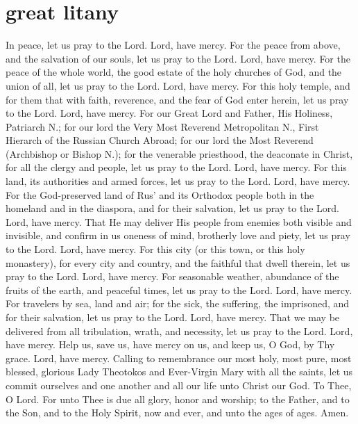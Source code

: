 \section{great litany}
\begin{liturgicaltext}
    \deacon In peace, let us pray to the Lord.
    \choir Lord, have mercy.
    \deacon For the peace from above, and the salvation of our souls, let us pray to the Lord.
    \choir Lord, have mercy.
    \deacon For the peace of the whole world, the good estate of the holy churches of God, and the union of all, let us pray to the Lord.
    \choir Lord, have mercy.
    \deacon For this holy temple, and for them that with faith, reverence, and the fear of God enter herein, let us pray to the Lord.
    \choir Lord, have mercy.
    \deacon For our Great Lord and Father, His Holiness, Patriarch N.; for our lord the Very Most Reverend Metropolitan N., First Hierarch of the Russian Church Abroad; for our lord the Most Reverend (Archbishop or Bishop N.); for the venerable priesthood, the deaconate in Christ, for all the clergy and people, let us pray to the Lord.
    \choir Lord, have mercy.
    \deacon For this land, its authorities and armed forces, let us pray to the Lord.
    \choir Lord, have mercy.
    \deacon For the God-preserved land of Rus' and its Orthodox people both in the homeland and in the diaspora, and for their salvation, let us pray to the Lord.
    \choir Lord, have mercy.
    \deacon That He may deliver His people from enemies both visible and invisible, and confirm in us oneness of mind, brotherly love and piety, let us pray to the Lord.
    \choir Lord, have mercy.
    \deacon For this city (or this town, or this holy monastery), for every city and country, and the faithful that dwell therein, let us pray to the Lord.
    \choir Lord, have mercy.
    \deacon For seasonable weather, abundance of the fruits of the earth, and peaceful times, let us pray to the Lord.
    \choir Lord, have mercy.
    \deacon For travelers by sea, land and air; for the sick, the suffering, the imprisoned, and for their salvation, let us pray to the Lord.
    \choir Lord, have mercy.
    \deacon That we may be delivered from all tribulation, wrath, and necessity, let us pray to the Lord.
    \choir Lord, have mercy.
    \deacon Help us, save us, have mercy on us, and keep us, O God, by Thy grace.
    \choir Lord, have mercy.
    \deacon Calling to remembrance our most holy, most pure, most blessed, glorious Lady Theotokos and Ever-Virgin Mary with all the saints, let us commit ourselves and one another and all our life unto Christ our God.
    \choir To Thee, O Lord.
    \priest For unto Thee is due all glory, honor and worship; to the Father, and to the Son, and to the Holy Spirit, now and ever, and unto the ages of ages.
    \choir Amen.
 \end{liturgicaltext}